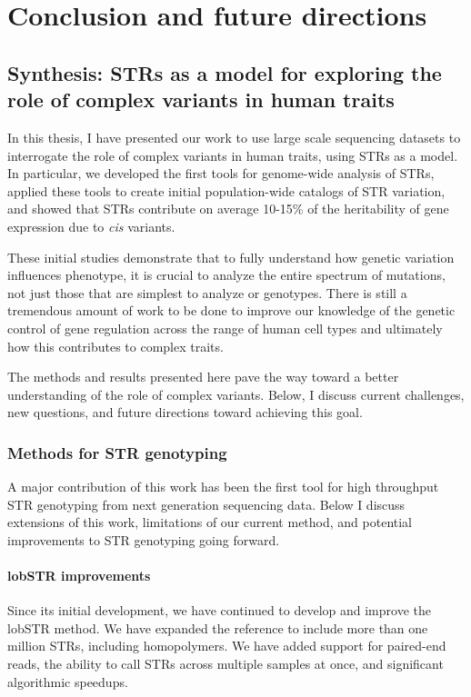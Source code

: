 \iffalse  \fi

\chapter{Conclusion and future directions}
\label{chap:conc}

\section{Synthesis: STRs as a model for exploring the role of complex variants in human traits}
In this thesis, I have presented our work to use large scale sequencing datasets to interrogate the role of complex variants in human traits, using STRs as a model. In particular, we developed the first tools for genome-wide analysis of STRs, applied these tools to create initial population-wide catalogs of STR variation, and showed that STRs contribute on average 10-15\% of the heritability of gene expression due to \emph{cis} variants.

These initial studies demonstrate that to fully understand how genetic variation influences phenotype, it is crucial to analyze the entire spectrum of mutations, not just those that are simplest to analyze or genotypes. There is still a tremendous amount of work to be done to improve our knowledge of the genetic control of gene regulation across the range of human cell types and ultimately how this contributes to complex traits.

The methods and results presented here pave the way toward a better understanding of the role of complex variants. Below, I discuss current challenges, new questions, and future directions toward achieving this goal.

\subsection{Methods for STR genotyping}
A major contribution of this work has been the first tool for high throughput STR genotyping from next generation sequencing data. Below I discuss extensions of this work, limitations of our current method, and potential improvements to STR genotyping going forward.

\subsubsection{lobSTR improvements}
Since its initial development, we have continued to develop and improve the lobSTR method. We have expanded the reference to include more than one million STRs, including homopolymers. We have added support for paired-end reads, the ability to call STRs across multiple samples at once, and significant algorithmic speedups.

